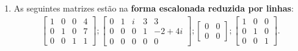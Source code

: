 \begin{exemplos}
    \begin{enumerate}[label={\arabic*})]
        \item As seguintes matrizes estão na \textbf{forma escalonada reduzida por linhas}:
            \begin{align*}
                \begin{bmatrix}
                    1 & 0 & 0 & 4\\
                    0 & 1 & 0 & 7\\
                    0 & 0 & 1 & 1
                \end{bmatrix};
                \begin{bmatrix}
                    0 & 1 & i & 3 & 3\\
                    0 & 0 & 0 & 1 & -2 + 4i\\
                    0 & 0 & 0 & 0 & 0
                \end{bmatrix};
                \begin{bmatrix}
                    0 & 0\\
                    0 & 0
                \end{bmatrix};
                \begin{bmatrix}
                    1 & 0 & 0\\
                    0 & 1 & 0\\
                    0 & 0 & 1
                \end{bmatrix}.
            \end{align*}


\end{enumerate}
\end{exemplos}
